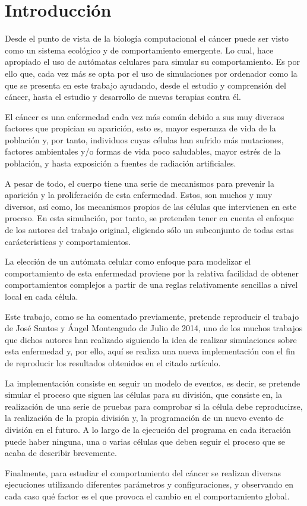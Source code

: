 \section{Introducción}

		Desde el punto de vista de la biología computacional el cáncer puede ser visto como un sistema ecológico y de comportamiento emergente.
		Lo cual, hace apropiado el uso de autómatas celulares para simular su comportamiento. Es por ello que, cada vez más se opta por el uso
		de simulaciones por ordenador como la que se presenta en este trabajo ayudando, desde el estudio y comprensión del cáncer, hasta
		el estudio y desarrollo de nuevas terapias contra él.

		El cáncer es una enfermedad cada vez más común debido a sus muy diversos factores que propician su aparición, esto es,
		mayor esperanza de vida de la población y, por tanto, individuos cuyas células han sufrido más mutaciones, factores ambientales y/o
		formas de vida poco saludables, mayor estrés de la población, y hasta exposición a fuentes de radiación artificiales.

		A pesar de todo, el cuerpo tiene una serie de mecanismos para prevenir la aparición y la proliferación de esta enfermedad. Estos,
		son muchos y muy diversos, así como, los mecanismos propios de las células que intervienen en este proceso. En esta simulación, por tanto,
		se pretenden tener en cuenta el enfoque de los autores del trabajo original, eligiendo sólo un subconjunto de todas estas
		carácteristicas y comportamientos.

		La elección de un autómata celular como enfoque para modelizar el comportamiento de esta enfermedad proviene por la relativa
		facilidad de obtener comportamientos complejos a partir de una reglas relativamente sencillas a nivel local en cada célula.

		Este trabajo, como se ha comentado previamente, pretende reproducir el trabajo de José Santos y Ángel Monteagudo de Julio de 2014,
		uno de los muchos trabajos que dichos autores han realizado siguiendo la idea de realizar simulaciones sobre esta enfermedad y, por ello, aquí
		se realiza una nueva implementación con el fin de reproducir los resultados obtenidos en el citado artículo.

		La implementación consiste en seguir un modelo de eventos, es decir, se pretende simular el proceso que siguen las células para su división, que
		consiste en, la realización de una serie de pruebas para comprobar si la célula debe reproducirse, la realización de la propia división y,
		la programación de un nuevo evento de división en el futuro. A lo largo de la ejecución del programa en cada iteración puede haber ninguna, una o
		varias células que deben seguir el proceso que se acaba de describir brevemente.

		Finalmente, para estudiar el comportamiento del cáncer se realizan diversas ejecuciones utilizando diferentes parámetros y configuraciones,
		y observando en cada caso qué factor es el que provoca el cambio en el comportamiento global.
